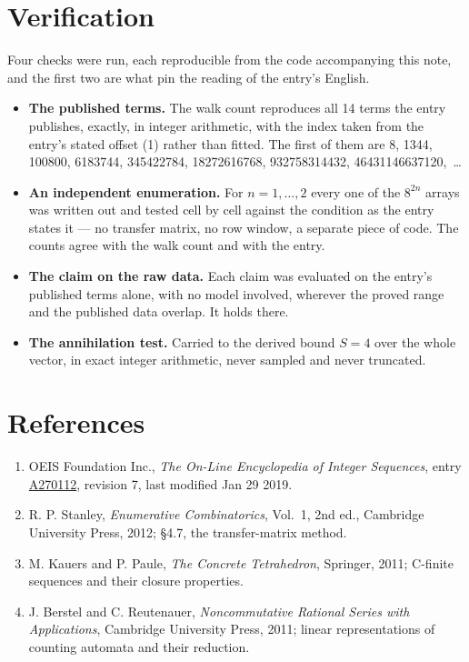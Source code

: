 \documentclass[11pt]{article}
\theoremstyle{definition}
\begin{document}
\section{Verification}

Four checks were run, each reproducible from the code accompanying this note, and the first two are what pin the reading of the entry's English.

\begin{itemize}

\item {\bfseries The published terms.} The walk count reproduces all 14 terms the entry publishes, exactly, in integer arithmetic, with the index taken from the entry's stated offset (1) rather than fitted. The first of them are 8, 1344, 100800, 6183744, 345422784, 18272616768, 932758314432, 46431146637120,~\dots

\item {\bfseries An independent enumeration.} For $n = 1,\dots,2$ every one of the $8^{2n}$ arrays was written out and tested cell by cell against the condition as the entry states it --- no transfer matrix, no row window, a separate piece of code. The counts agree with the walk count and with the entry.

\item {\bfseries The claim on the raw data.} Each claim was evaluated on the entry's published terms alone, with no model involved, wherever the proved range and the published data overlap. It holds there.

\item {\bfseries The annihilation test.} Carried to the derived bound $S = 4$ over the whole vector, in exact integer arithmetic, never sampled and never truncated.

\end{itemize}

\section{References}

\begin{enumerate}

\item OEIS Foundation Inc., \emph{The On-Line Encyclopedia of Integer Sequences}, entry \href{https://oeis.org/A270112}{A270112}, revision 7, last modified Jan 29 2019.

\item R. P. Stanley, \emph{Enumerative Combinatorics}, Vol.~1, 2nd ed., Cambridge University Press, 2012; \S4.7, the transfer-matrix method.

\item M. Kauers and P. Paule, \emph{The Concrete Tetrahedron}, Springer, 2011; C-finite sequences and their closure properties.

\item J. Berstel and C. Reutenauer, \emph{Noncommutative Rational Series with Applications}, Cambridge University Press, 2011; linear representations of counting automata and their reduction.

\end{enumerate}
\end{document}
